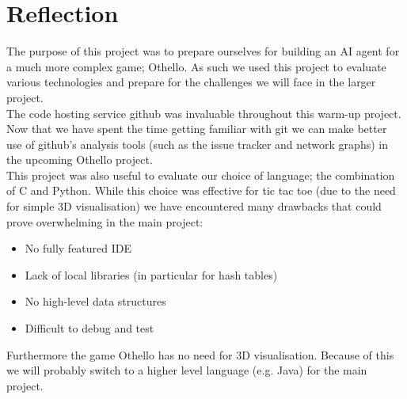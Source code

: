 \documentclass[10pt,twocolumn]{article}
\begin{document}
\section{Reflection}
The purpose of this project was to prepare ourselves for building an AI agent for
a much more complex game; Othello. As such we used this project to evaluate various
technologies and prepare for the challenges we will face in the larger project.\\
The code hosting service github was invaluable throughout this warm-up
project. Now that we have spent the time getting familiar with git
we can make better use of github's analysis tools (such as
the issue tracker and network graphs) in the upcoming Othello project.\\
This project was also useful to evaluate our choice of language; the combination
of C and Python. While this choice was effective for tic tac toe (due to the
need for simple 3D visualisation) we have encountered many drawbacks that 
could prove overwhelming in the main project:
\begin{itemize}
\item No fully featured IDE
\item Lack of local libraries (in particular for hash tables)
\item No high-level data structures
\item Difficult to debug and test
\end{itemize}
Furthermore the game Othello has no need for 3D visualisation. Because of this
we will probably switch to a higher level language (e.g. Java) for the main
project.




\end{document}
